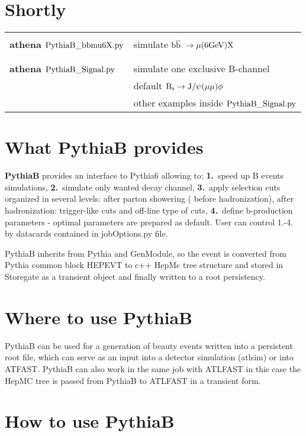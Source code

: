 \section{Shortly}
\begin{tabular}{|l|l|}
 \hline
& \\
 \bf{athena $\rm PythiaB\_bbmu6X.py$} &simulate $\rm \mbox{$\rm b\overline{b}\ $} \rightarrow
\mu(6GeV) X$ \\
& \\
\hline & \\
\bf{athena  $\rm PythiaB\_Signal.py$} & simulate one exclusive B-channel \\
   &     default   $ \rm B_{s} \rightarrow J/\psi(\mu\mu) \phi $ \\
   &     other examples  inside $\rm PythiaB\_Signal.py $\\
\hline
\end{tabular}
\section{What PythiaB provides }

{\bf PythiaB} provides an interface to Pythia6 allowing to: {\bf
1.}~speed up B events simulations, {\bf 2.}~simulate only wanted
decay channel,  {\bf 3.}~apply selection cuts organized in several
levels: after parton showering ( before hadronization), after
hadronization: trigger-like cuts and off-line type of cuts, {\bf
4.}~define b-production  parameters - optimal parameters are
prepared as default. User can control 1.-4. by datacards contained
in jobOptions.py file.

  PythiaB inherits from Pythia and GenModule, so the event is converted
  from Pythia common block HEPEVT to c++  HepMc tree structure
  and stored in Storegate as a transient object and finally written to a root persistency.
  
\section{Where to use PythiaB}

PythiaB can be used for a generation of beauty events 
written into a persistent root file, which can serve as an input into 
a detector simulation
(atlsim) or into ATFAST. PythiaB can also work in the same job with ATLFAST 
  in this case the HepMC tree is passed from PythiaB to ATLFAST in
  a transient form. 
\section{How to use PythiaB}



